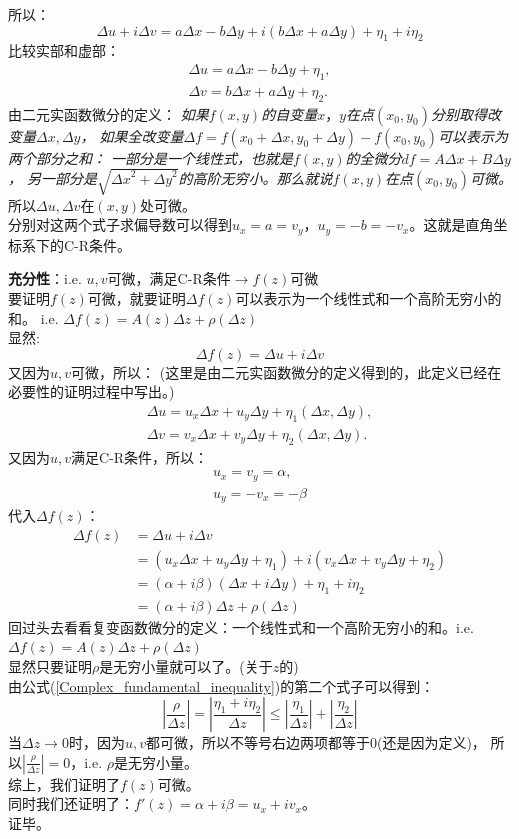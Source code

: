 \documentclass[cn,hazy,blue,14pt,normal]{elegantnote}
\numberwithin{equation}{section}
\begin{document}
所以：
$$
\Delta u + i \Delta v=a\Delta x-b\Delta y+i(b\Delta x+a\Delta y)+\eta_1 + i\eta_2
$$
比较实部和虚部：
\begin{gather*}
	\Delta u=a\Delta x-b\Delta y+\eta_1,\\
	\Delta v=b\Delta x+a\Delta y+\eta_2.
\end{gather*}
由二元实函数微分的定义：
\emph{如果$f(x,y)$的自变量$x，y$在点$(x_0,y_0)$分别取得改变量$\Delta x,\Delta y$，
如果全改变量$\Delta f=f(x_0+\Delta x,y_0+\Delta y)-f(x_0,y_0)$可以表示为两个部分之和：
一部分是一个线性式，也就是$f(x,y)$的全微分$df=A\Delta x+ B\Delta y$，
另一部分是$\sqrt{{\Delta x}^2+{\Delta y}^2}$的高阶无穷小。那么就说$f(x,y)$在点$(x_0,y_0)$可微。}\\
所以$\Delta u,\Delta v$在$(x,y)$处可微。\\
分别对这两个式子求偏导数可以得到$u_x=a=v_y$，$u_y=-b=-v_x$。这就是直角坐标系下的C-R条件。\\

\par \textbf{充分性}：i.e. $u,v$可微，满足C-R条件$\to f(z)$可微\\
要证明$f(z)$可微，就要证明$\Delta f(z)$可以表示为一个线性式和一个高阶无穷小的和。
i.e. $\Delta f(z)=A(z)\Delta z+\rho(\Delta z)$\\
显然:$$\Delta f(z)=\Delta u+i\Delta v$$
又因为$u,v$可微，所以：
(这里是由二元实函数微分的定义得到的，此定义已经在必要性的证明过程中写出。)
\begin{gather*}
	\Delta u=u_x\Delta x+u_y\Delta y+\eta_1(\Delta x,\Delta y),\\
	\Delta v=v_x\Delta x+v_y\Delta y+\eta_2(\Delta x,\Delta y).
\end{gather*}
又因为$u,v$满足C-R条件，所以：
\begin{gather*}
	u_x=v_y=\alpha,\\
	u_y=-v_x=-\beta
\end{gather*}
代入$\Delta f(z)$：
\begin{align*}
	\Delta f(z)&=\Delta u+i\Delta v\\
	&=(u_x\Delta x+u_y\Delta y+\eta_1)+i(v_x\Delta x+v_y\Delta y+\eta_2)\\
	&=(\alpha+i\beta)(\Delta x+i\Delta y)+\eta_1+i\eta_2\\
	&=(\alpha+i\beta)\Delta z+\rho(\Delta z)
\end{align*}
回过头去看看复变函数微分的定义：一个线性式和一个高阶无穷小的和。i.e. $\Delta f(z)=A(z)\Delta z+\rho(\Delta z)$\\
显然只要证明$\rho$是无穷小量就可以了。(关于$z$的)\\
由公式(\ref{Complex_fundamental_inequality})的第二个式子可以得到：
$$
\left\lvert \frac{\rho}{\Delta z} \right\rvert=\left\lvert \frac{\eta_1+i\eta_2}{\Delta z} \right\rvert
\leqslant\left\lvert \frac{\eta_1}{\Delta z} \right\rvert+\left\lvert \frac{\eta_2}{\Delta z} \right\rvert
$$
当$\Delta z \to 0$时，因为$u,v$都可微，所以不等号右边两项都等于0(还是因为定义)，
所以$\left\lvert \frac{\rho}{\Delta z} \right\rvert=0$，i.e. $\rho$是无穷小量。\\
综上，我们证明了$f(z)$可微。\\
同时我们还证明了：$f'(z)=\alpha+i\beta=u_x+iv_x$。\\
证毕。
\end{document}
